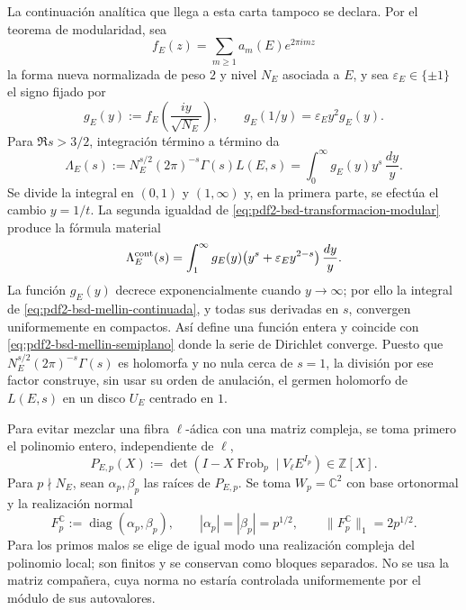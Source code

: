 La continuación analítica que llega a esta carta tampoco se declara. Por el
teorema de modularidad, sea
\[
 f_E(z)=\sum_{m\geq1}a_m(E)e^{2\pi imz}
\]
la forma nueva normalizada de peso $2$ y nivel $N_E$ asociada a $E$, y sea
$\varepsilon_E\in\{\pm1\}$ el signo fijado por
\begin{equation}\label{eq:pdf2-bsd-transformacion-modular}
 g_E(y):=f_E\!\left(\frac{iy}{\sqrt{N_E}}\right),
 \qquad
 g_E(1/y)=\varepsilon_Ey^2g_E(y).
\end{equation}
Para $\Re s>3/2$, integración término a término da
\begin{equation}\label{eq:pdf2-bsd-mellin-semiplano}
 \Lambda_E(s):=N_E^{s/2}(2\pi)^{-s}\Gamma(s)L(E,s)
 =\int_0^\infty g_E(y)y^s\,\frac{dy}{y}.
\end{equation}
Se divide la integral en $(0,1)$ y $(1,\infty)$ y, en la primera parte, se
efectúa el cambio $y=1/t$. La segunda igualdad de
\eqref{eq:pdf2-bsd-transformacion-modular} produce la fórmula material
\begin{equation}\label{eq:pdf2-bsd-mellin-continuada}
 \Lambda_E^{\rm cont}(s)=
 \int_1^\infty g_E(y)
       \bigl(y^s+\varepsilon_Ey^{2-s}\bigr)\,\frac{dy}{y}.
\end{equation}
La función $g_E(y)$ decrece exponencialmente cuando $y\to\infty$; por ello la
integral de \eqref{eq:pdf2-bsd-mellin-continuada}, y todas sus derivadas en
$s$, convergen uniformemente en compactos. Así define una función entera y
coincide con \eqref{eq:pdf2-bsd-mellin-semiplano} donde la serie de Dirichlet
converge. Puesto que
$N_E^{s/2}(2\pi)^{-s}\Gamma(s)$ es holomorfa y no nula cerca de $s=1$, la
división por ese factor construye, sin usar su orden de anulación, el germen
holomorfo de $L(E,s)$ en un disco $U_E$ centrado en $1$.

Para evitar mezclar una fibra $\ell$-ádica con una matriz compleja, se toma
primero el polinomio entero, independiente de $\ell$,
\begin{equation}\label{eq:pdf2-bsd-polinomio-local-entero}
 P_{E,p}(X):=\det(I-X\operatorname{Frob}_p\mid V_\ell E^{I_p})
 \in\mathbb Z[X].
\end{equation}
Para $p\nmid N_E$, sean $\alpha_p,\beta_p$ las raíces de $P_{E,p}$. Se toma
$W_p=\mathbb C^2$ con base ortonormal y la realización normal
\begin{equation}\label{eq:pdf2-bsd-realizacion-normal-frobenius}
 F_p^{\mathbb C}:=\operatorname{diag}(\alpha_p,\beta_p),
 \qquad |\alpha_p|=|\beta_p|=p^{1/2},
 \qquad \|F_p^{\mathbb C}\|_1=2p^{1/2}.
\end{equation}
Para los primos malos se elige de igual modo una realización compleja del
polinomio local; son finitos y se conservan como bloques separados. No se usa
la matriz compañera, cuya norma no estaría controlada uniformemente por el
módulo de sus autovalores.

